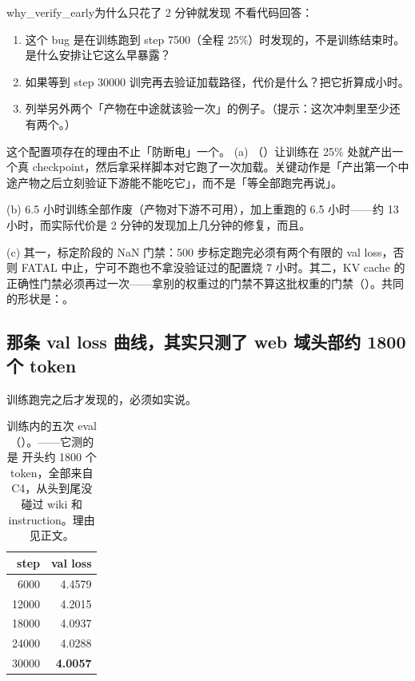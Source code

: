\begin{checkpoint}{why_verify_early}{为什么只花了 2 分钟就发现}
不看代码回答：
\begin{enumerate}[label=(\alph*)]
  \item 这个 bug 是在训练跑到 step 7500（全程 25\%）时发现的，不是训练结束时。是什么安排让它这么早暴露？
  \item 如果等到 step 30000 训完再去验证加载路径，代价是什么？把它折算成小时。
  \item 列举另外两个「产物在中途就该验一次」的例子。（提示：这次冲刺里至少还有两个。）
\end{enumerate}
\hint {} 这个配置项存在的理由不止「防断电」一个。
\ifshowanswers
\tcblower
\answer (a) （）让训练在 25\% 处就产出一个真 checkpoint，然后拿采样脚本对它跑了一次加载。关键动作是「产出第一个中途产物之后立刻验证下游能不能吃它」，而不是「等全部跑完再说」。

(b) 6.5 小时训练全部作废（产物对下游不可用），加上重跑的 6.5 小时——约 13 小时，而实际代价是 2 分钟的发现加上几分钟的修复，而且。

(c) 其一，标定阶段的 NaN 门禁：500 步标定跑完必须有两个有限的 val loss，否则 FATAL 中止，宁可不跑也不拿没验证过的配置烧 7 小时。其二，KV cache 的正确性门禁必须再过一次——拿别的权重过的门禁不算这批权重的门禁（）。共同的形状是：。
\whereincode {}
\fi
\end{checkpoint}

\subsection{那条 val loss 曲线，其实只测了 web 域头部约 1800 个 token}
\label{subsec:valcurve}

训练跑完之后才发现的，必须如实说。

\begin{table}[t]
\centering
\begin{tabular}{rr}
\toprule
step & val loss \\
\midrule
6000  & 4.4579 \\
12000 & 4.2015 \\
18000 & 4.0937 \\
24000 & 4.0288 \\
30000 & \textbf{4.0057} \\
\bottomrule
\end{tabular}
\caption{训练内的五次 eval（）。——它测的是  开头约 1800 个 token，全部来自 C4，从头到尾没碰过 wiki 和 instruction。理由见正文。}
\label{tab:val-curve}
\end{table}

